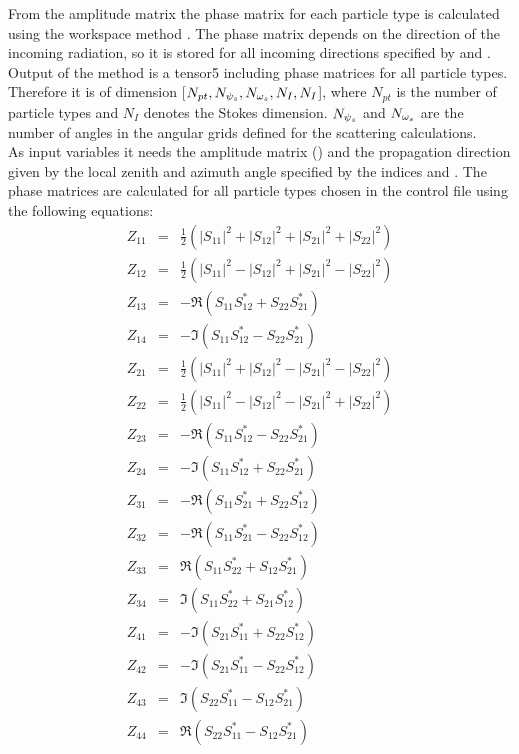 \label{sec:scattering:pha_mat_spt}

From the amplitude matrix the phase matrix for each particle type is
calculated using the workspace method .
The phase matrix depends on the direction of the incoming radiation,
so it is stored for all incoming directions specified by
 and
.\\
Output of the method is a tensor5 including phase matrices for all
particle types. Therefore it is of dimension [$N_{pt}, N_{{\psi_s}},
N_{{\omega_s}}, N_{I}, N_{I}$], where $N_{pt}$ is the number of particle
types and $N_{I}$ denotes the Stokes dimension. $N_{{\psi_s}}$ and
$N_{{\omega_s}}$ are the number of angles in the angular grids defined for
the scattering calculations.\\
As input variables it needs the amplitude matrix ()
and the propagation direction given by the local zenith and azimuth
angle specified by the indices  and
.  The phase matrices \PhaMat{} are
calculated for all particle types chosen in the control file using the
following equations:
\begin{eqnarray}
  Z_{11} &=& \frac{1}{2}(|S_{11}|^2+|S_{12}|^2+|S_{21}|^2+|S_{22}|^2)\\
  Z_{12} &=& \frac{1}{2}(|S_{11}|^2-|S_{12}|^2+|S_{21}|^2-|S_{22}|^2)\\
  Z_{13} &=& -\Re(S_{11}S_{12}^*+S_{22}S_{21}^*)\\
  Z_{14} &=& -\Im(S_{11}S_{12}^*-S_{22}S_{21}^*)\\
  Z_{21} &=& \frac{1}{2}(|S_{11}|^2+|S_{12}|^2-|S_{21}|^2-|S_{22}|^2)\\
  Z_{22} &=& \frac{1}{2}(|S_{11}|^2-|S_{12}|^2-|S_{21}|^2+|S_{22}|^2)\\
  Z_{23} &=& -\Re(S_{11}S_{12}^*-S_{22}S_{21}^*)\\
  Z_{24} &=& -\Im(S_{11}S_{12}^*+S_{22}S_{21}^*)\\
  Z_{31} &=& -\Re(S_{11}S_{21}^*+S_{22}S_{12}^*)\\
  Z_{32} &=& -\Re(S_{11}S_{21}^*-S_{22}S_{12}^*)\\
  Z_{33} &=& \Re(S_{11}S_{22}^*+S_{12}S_{21}^*)\\
  Z_{34} &=& \Im(S_{11}S_{22}^*+S_{21}S_{12}^*)\\
  Z_{41} &=& -\Im(S_{21}S_{11}^*+S_{22}S_{12}^*)\\
  Z_{42} &=& -\Im(S_{21}S_{11}^*-S_{22}S_{12}^*)\\
  Z_{43} &=& \Im(S_{22}S_{11}^*-S_{12}S_{21}^*)\\
  Z_{44} &=& \Re(S_{22}S_{11}^*-S_{12}S_{21}^*)
\end{eqnarray}


